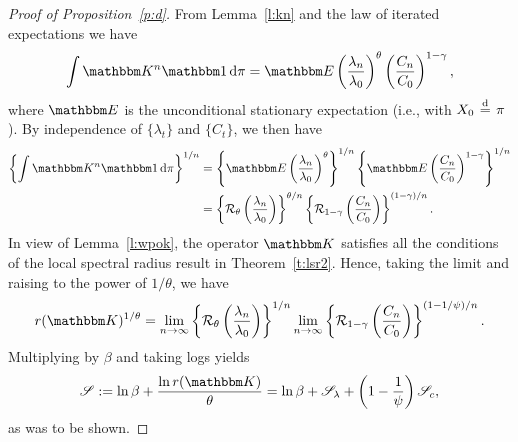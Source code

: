 \documentclass[12pt, reqno]{amsart}
\newcommand{\eqdist}{\stackrel {\textrm{ \scriptsize{d} }} {=} }
\newcommand{\1}{\mathbbm 1}
\newcommand*\diff{\mathop{}\!\mathrm{d}}
\newcommand{\rR}{\mathcal R}
\newcommand{\sS}{\mathscr S}
\newcommand{\KK}{\mathbbm K}
\newcommand{\EE}{\mathbbm E}
\theoremstyle{plain}
\theoremstyle{definition}
\begin{document}
\begin{proof}[Proof of Proposition~\ref{p:d}]
    From Lemma~\ref{l:kn} and the law of iterated expectations we have
    \begin{equation*}
       \int \KK^n \1 \diff \pi
        = \EE
         \left( \frac{\lambda_n}{\lambda_0} \right)^\theta
         \left( \frac{C_n}{C_0} \right)^{1-\gamma} ,
    \end{equation*}
    where $\EE$ is the unconditional stationary expectation (i.e., with $X_0 \eqdist \pi$).
    By independence of $\{\lambda_t\}$ and $\{ C_t \}$, we then have
    \begin{align*}
       \left\{
           \int \KK^n \1 \diff \pi
       \right\}^{1/n}
       & =
        \left\{
            \EE \left( \frac{\lambda_n}{\lambda_0} \right)^\theta
        \right\}^{1/n}
        \left\{
            \EE \left( \frac{C_n}{C_0} \right)^{1-\gamma} 
        \right\}^{1/n}
        \\
       & =
        \left\{
            \rR_\theta \left( \frac{\lambda_n}{\lambda_0} \right)
        \right\}^{\theta/n}
        \left\{
            \rR_{1-\gamma} \left( \frac{C_n}{C_0} \right)
        \right\}^{(1-\gamma)/n}.
    \end{align*}
    In view of Lemma~\ref{l:wpok}, the operator $\KK$ satisfies all the
    conditions of the local spectral radius result in Theorem~\ref{t:lsr2}.
    Hence, taking the limit and raising to the power of $1/\theta$, we have
    \begin{equation*}
        r(\KK)^{1/\theta} = 
        \lim_{n\to \infty} \left\{
            \rR_\theta \left( \frac{\lambda_n}{\lambda_0} \right)
        \right\}^{1/n}
        \lim_{n\to \infty}
        \left\{
            \rR_{1-\gamma} \left( \frac{C_n}{C_0} \right)
        \right\}^{(1-1/\psi)/n}.
    \end{equation*}
    Multiplying by $\beta$ and taking logs yields
    \begin{equation*}
        \sS := \ln \beta + \frac{\ln r(\KK)}{\theta} 
        = \ln \beta 
            + \sS_\lambda 
            + \left(1-\frac{1}{\psi}\right) \sS_c,
    \end{equation*}
    as was to be shown.
\end{proof}
\end{document}
